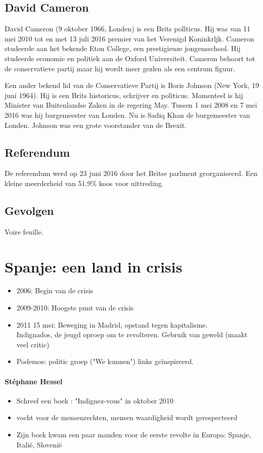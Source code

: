 \documentclass{article}
\begin{document}
\subsection{David Cameron}
David Cameron (9 oktober 1966, Londen) is een Brits pollticus. Hij was van 11 mei
2010 tot en met 13 juli 2016 premier van het Verenigd Koninkrljk. Cameron studeerde
aan het bekende Eton College, een prestigieuze jongensschool. Hij studeerde
economie en politiek aan de Oxford Universiteit. Cameron behoort tot de conservatieve
partij maar hij wordt meer gezlen als een centrum figuur.\\
\par
Een ander bekend lid van de Conservatieve Partij is Boris Johnson (New York, 19 juni
1964). Hij is een Brits historicus, schrijver en politicus. Momenteel is hij Minister van
Buitenlandse Zaken in de regering May. Tussen 1 mei 2008 en 7 mei 2016 was hij
burgemeester van Londen. Nu is Sadiq Khan de burgemeester van Londen. Johnson
was een grote voorstander van de Brexit.\\

\subsection{Referendum}
De referendum werd op 23 juni 2016 door het Britse parlment georganiseerd. Een kleine meerderheid van 51.9\% koos voor uittreding.

\subsection{Gevolgen}
Voire feuille.

\section{Spanje: een land in crisis}
\begin{itemize}
    \item 2006: Begin van de crisis
    \item 2009-2010: Hoogste punt van de crisis
    \item 2011 15 mei: Beweging in Madrid, opstand tegen kapitalisme.\\
    Indignados, de jeugd oproep om te revolteren. Gebruik van geweld (maakt veel critic)
    \item Podemos: politic groep ("We kunnen") links geïnspireerd.
\end{itemize}
\paragraph{Stéphane Hessel}
\begin{itemize}
    \item Schreef een boek : "Indignez-vous" in oktober 2010
    \item vocht voor de mensenrechten, mensen waardigheid wordt gerespecteerd
    \item Zijn boek kwam een paar manden voor de eerste revolte in Europa: Spanje, Italië, Slovenië
\end{itemize}
\end{document}
